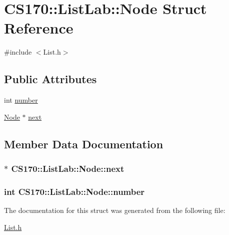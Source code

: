 \hypertarget{struct_c_s170_1_1_list_lab_1_1_node}{\section{C\-S170\-:\-:List\-Lab\-:\-:Node Struct Reference}
\label{struct_c_s170_1_1_list_lab_1_1_node}
}


{\ttfamily \#include $<$List.\-h$>$}

\subsection*{Public Attributes}
\begin{DoxyCompactItemize}
\item 
int \hyperlink{struct_c_s170_1_1_list_lab_1_1_node_a47d68bf6dcda11fb33cbae1e11ad82a0}{number}
\item 
\hyperlink{struct_c_s170_1_1_list_lab_1_1_node}{Node} $\ast$ \hyperlink{struct_c_s170_1_1_list_lab_1_1_node_a696b86640701eb95456b6a23b1e61464}{next}
\end{DoxyCompactItemize}


\subsection{Member Data Documentation}
\hypertarget{struct_c_s170_1_1_list_lab_1_1_node_a696b86640701eb95456b6a23b1e61464}{
\subsubsection[{next}]{$\ast$ {\bf C\-S170\-::\-List\-Lab\-::\-Node\-::next}}}\label{struct_c_s170_1_1_list_lab_1_1_node_a696b86640701eb95456b6a23b1e61464}
\hypertarget{struct_c_s170_1_1_list_lab_1_1_node_a47d68bf6dcda11fb33cbae1e11ad82a0}{
\subsubsection[{number}]{\setlength{\rightskip}{0pt plus 5cm}int {\bf C\-S170\-::\-List\-Lab\-::\-Node\-::number}}}\label{struct_c_s170_1_1_list_lab_1_1_node_a47d68bf6dcda11fb33cbae1e11ad82a0}


The documentation for this struct was generated from the following file\-:\begin{DoxyCompactItemize}
\item 
\hyperlink{_list_8h}{List.\-h}\end{DoxyCompactItemize}
